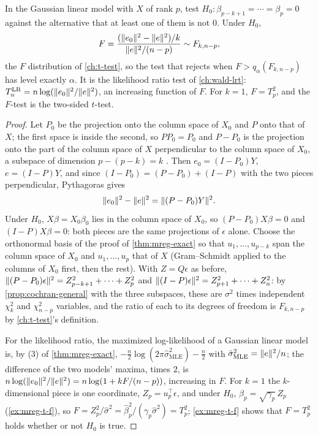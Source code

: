 \begin{theorem}
\label{thm:mreg-ftest}
In the Gaussian linear model with $X$ of rank $p$, test $H_0: \beta_{p-k+1} = \cdots = \beta_p = 0$ against the alternative that at least one of them is not $0$.
Under $H_0$,
\[
F = \frac{(\lVert e_0\rVert^2 - \lVert e\rVert^2)/k}{\lVert e\rVert^2/(n - p)} \sim F_{k, n-p},
\]
the $F$ distribution of \cref{ch:t-test}, so the test that rejects when $F > q_\alpha(F_{k, n-p})$ has level exactly $\alpha$.
It is the likelihood ratio test of \cref{ch:wald-lrt}: $T^{\mathrm{LR}}_n = n\log(\lVert e_0\rVert^2/\lVert e\rVert^2)$, an increasing function of $F$.
For $k = 1$, $F = T_p^2$, and the $F$-test is the two-sided $t$-test.
\end{theorem}
\begin{proof}
Let $P_0$ be the projection onto the column space of $X_0$ and $P$ onto that of $X$; the first space is inside the second, so $PP_0 = P_0$ and $P - P_0$ is the projection onto the part of the column space of $X$ perpendicular to the column space of $X_0$, a subspace of dimension $p - (p - k) = k$ .
Then $e_0 = (I - P_0)Y$, $e = (I - P)Y$, and since $(I - P_0) = (P - P_0) + (I - P)$ with the two pieces perpendicular, Pythagoras gives
\[
\lVert e_0\rVert^2 - \lVert e\rVert^2 = \lVert(P - P_0)Y\rVert^2.
\]
Under $H_0$, $X\beta = X_0\beta_0$ lies in the column space of $X_0$, so $(P - P_0)X\beta = 0$ and $(I - P)X\beta = 0$: both pieces are the same projections of $\epsilon$ alone.
Choose the orthonormal basis of the proof of \cref{thm:mreg-exact} so that $u_1, \ldots, u_{p-k}$ span the column space of $X_0$ and $u_1, \ldots, u_p$ that of $X$ (Gram--Schmidt applied to the columns of $X_0$ first, then the rest).
With $Z = Q\epsilon$ as before, $\lVert(P - P_0)\epsilon\rVert^2 = Z_{p-k+1}^2 + \cdots + Z_p^2$ and $\lVert(I - P)\epsilon\rVert^2 = Z_{p+1}^2 + \cdots + Z_n^2$: by \cref{prop:cochran-general} with the three subspaces, these are $\sigma^2$ times independent $\chi^2_k$ and $\chi^2_{n-p}$ variables, and the ratio of each to its degrees of freedom is $F_{k, n-p}$ by \cref{ch:t-test}'s definition.

For the likelihood ratio, the maximized log-likelihood of a Gaussian linear model is, by (3) of \cref{thm:mreg-exact}, $-\frac{n}{2}\log(2\pi\hat{\sigma}^2_{\mathrm{MLE}}) - \frac{n}{2}$ with $\hat{\sigma}^2_{\mathrm{MLE}} = \lVert e\rVert^2/n$; the difference of the two models' maxima, times $2$, is $n\log(\lVert e_0\rVert^2/\lVert e\rVert^2) = n\log(1 + kF/(n - p))$, increasing in $F$.
For $k = 1$ the $k$-dimensional piece is one coordinate, $Z_p = u_p^\top\epsilon$, and under $H_0$, $\hat{\beta}_p = \sqrt{\gamma_p}\,Z_p$ (\cref{ex:mreg-t-f}), so $F = Z_p^2/\hat{\sigma}^2 = \hat{\beta}_p^2/(\gamma_p\hat{\sigma}^2) = T_p^2$; \cref{ex:mreg-t-f} shows that $F = T_p^2$ holds whether or not $H_0$ is true.
\end{proof}

